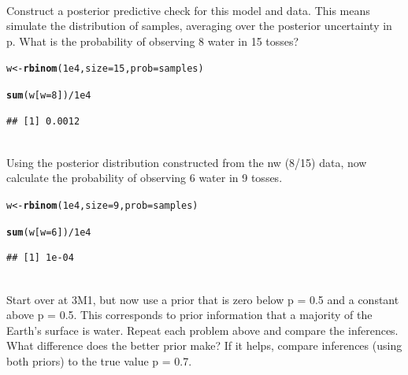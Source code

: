 \documentclass[12pt]{article}\usepackage[]{graphicx}\usepackage[]{color}
\makeatletter
\newcommand{\hlnum}[1]{\textcolor[rgb]{0.686,0.059,0.569}{#1}}%
\newcommand{\hlopt}[1]{\textcolor[rgb]{0,0,0}{#1}}%
\newcommand{\hlstd}[1]{\textcolor[rgb]{0.345,0.345,0.345}{#1}}%
\newcommand{\hlkwb}[1]{\textcolor[rgb]{0.69,0.353,0.396}{#1}}%
\newcommand{\hlkwc}[1]{\textcolor[rgb]{0.333,0.667,0.333}{#1}}%
\newcommand{\hlkwd}[1]{\textcolor[rgb]{0.737,0.353,0.396}{\textbf{#1}}}%
\newenvironment{kframe}{%
 \def\at@end@of@kframe{}%
 \ifinner\ifhmode%
  \def\at@end@of@kframe{\end{minipage}}%
  \begin{minipage}{\columnwidth}%
 \fi\fi%
 \def\FrameCommand##1{\hskip\@totalleftmargin \hskip-\fboxsep
 \colorbox{shadecolor}{##1}\hskip-\fboxsep
     \hskip-\linewidth \hskip-\@totalleftmargin \hskip\columnwidth}%
 \MakeFramed {\advance\hsize-\width
   \@totalleftmargin\z@ \linewidth\hsize
   \@setminipage}}%
 {\par\unskip\endMakeFramed%
 \at@end@of@kframe}
\newenvironment{knitrout}{}{} %
\newenvironment{problem}[2][Problem]{\begin{trivlist}
\item[\hskip \labelsep {\bfseries #1}\hskip \labelsep {\bfseries #2.}]}{\end{trivlist}}
\makeatother
\begin{document}
\begin{problem}{3M3}
\text{}\\
Construct a posterior predictive check for this model and data. This means simulate the distribution of samples, averaging over the posterior uncertainty in p. What is the probability of observing 8 water in 15 tosses?
\end{problem}

\begin{knitrout}
\color{fgcolor}\begin{kframe}
\begin{alltt}
\hlstd{w} \hlkwb{<-} \hlkwd{rbinom}\hlstd{(}\hlnum{1e4}\hlstd{,} \hlkwc{size} \hlstd{=} \hlnum{15}\hlstd{,} \hlkwc{prob} \hlstd{= samples)}

\hlkwd{sum}\hlstd{(w[}\hlkwc{w} \hlstd{=} \hlnum{8}\hlstd{])} \hlopt{/} \hlnum{1e4}
\end{alltt}
\begin{verbatim}
## [1] 0.0012
\end{verbatim}
\end{kframe}
\end{knitrout}

\begin{problem}{3M4}
\text{}\\
Using the posterior distribution constructed from the nw (8/15) data, now calculate the probability of observing 6 water in 9 tosses.
\end{problem}

\begin{knitrout}
\color{fgcolor}\begin{kframe}
\begin{alltt}
\hlstd{w} \hlkwb{<-} \hlkwd{rbinom}\hlstd{(}\hlnum{1e4}\hlstd{,} \hlkwc{size} \hlstd{=} \hlnum{9}\hlstd{,} \hlkwc{prob} \hlstd{= samples)}

\hlkwd{sum}\hlstd{(w[}\hlkwc{w} \hlstd{=} \hlnum{6}\hlstd{])} \hlopt{/} \hlnum{1e4}
\end{alltt}
\begin{verbatim}
## [1] 1e-04
\end{verbatim}
\end{kframe}
\end{knitrout}

\begin{problem}{3M5}
\text{}\\
Start over at 3M1, but now use a prior that is zero below p = 0.5 and a constant above p = 0.5. This corresponds to prior information that a majority of the Earth's surface is water. Repeat each problem above and compare the inferences. What difference does the better prior make? If it helps, compare inferences (using both priors) to the true value p = 0.7.
\end{problem}
\end{document}

